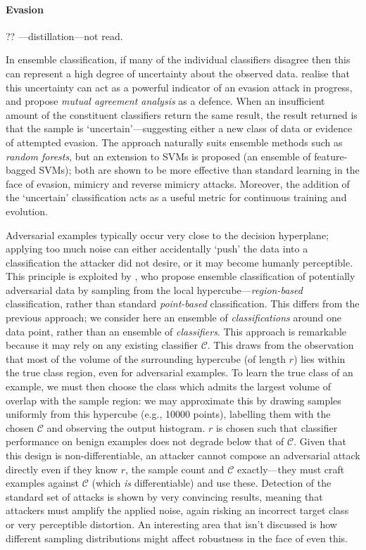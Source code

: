 \paragraph{Evasion}

?? \textcite{DBLP:conf/sp/PapernotM0JS16}---distillation---not read.

In ensemble classification, if many of the individual classifiers disagree then this can represent a high degree of uncertainty about the observed data.
\textcite{DBLP:conf/ndss/SmutzS16} realise that this uncertainty can act as a powerful indicator of an evasion attack in progress, and propose \emph{mutual agreement analysis} as a defence.
When an insufficient amount of the constituent classifiers return the same result, the result returned is that the sample is `uncertain'---suggesting either a new class of data or evidence of attempted evasion.
The approach naturally suits ensemble methods such as \emph{random forests}, but an extension to SVMs is proposed (an ensemble of feature-bagged SVMs); both are shown to be more effective than standard learning in the face of evasion, mimicry and reverse mimicry attacks.
Moreover, the addition of the `uncertain' classification acts as a useful metric for continuous training and evolution.

Adversarial examples typically occur very close to the decision hyperplane; applying too much noise can either accidentally `push' the data into a classification the attacker did not desire, or it may become humanly perceptible.
This principle is exploited by \textcite{DBLP:conf/acsac/CaoG17}, who propose ensemble classification of potentially adversarial data by sampling from the local hypercube---\emph{region-based} classification, rather than standard \emph{point-based} classification.
This differs from the previous approach; we consider here an ensemble of \emph{classifications} around one data point, rather than an ensemble of \emph{classifiers}.
This approach is remarkable because it may rely on any existing classifier $\mathcal{C}$.
This draws from the observation that most of the volume of the surrounding hypercube (of length $r$) lies within the true class region, even for adversarial examples.
To learn the true class of an example, we must then choose the class which admits the largest volume of overlap with the sample region: we may approximate this by drawing samples uniformly from this hypercube (e.g., \num{10000} points), labelling them with the chosen $\mathcal{C}$ and observing the output histogram.
$r$ is chosen such that classifier performance on benign examples does not degrade below that of $\mathcal{C}$.
Given that this design is non-differentiable, an attacker cannot compose an adversarial attack directly even if they know $r$, the sample count and $\mathcal{C}$ exactly---they must craft examples against $\mathcal{C}$ (which \emph{is} differentiable) and use these.
Detection of the standard set of attacks \cite{DBLP:conf/sp/Carlini017} is shown by very convincing results, meaning that attackers must amplify the applied noise, again risking an incorrect target class or very perceptible distortion.
An interesting area that isn't discussed is how different sampling distributions might affect robustness in the face of even this.

